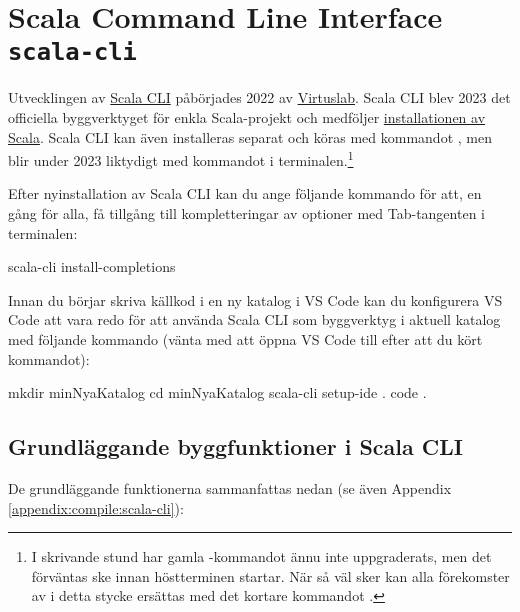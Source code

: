 \section{Scala Command Line Interface \texttt{scala-cli}}\label{appendix:build:scala-cli}

Utvecklingen av \href{https://scala-cli.virtuslab.org/}{Scala CLI} påbörjades 2022 av \href{https://virtuslab.com/}{Virtuslab}. Scala CLI blev 2023 det officiella byggverktyget för enkla Scala-projekt och medföljer \href{https://www.scala-lang.org/download/}{installationen av Scala}. Scala CLI kan även installeras separat och köras med kommandot , men blir under 2023 liktydigt med kommandot  i terminalen.\footnote{I skrivande stund har gamla -kommandot ännu inte uppgraderats, men det förväntas ske innan höstterminen startar. När så väl sker kan alla förekomster av  i detta stycke ersättas med det kortare kommandot .}

Efter nyinstallation av Scala CLI kan du ange följande kommando för att, en gång för alla, få tillgång till kompletteringar av optioner med Tab-tangenten i terminalen:
\begin{REPLsmall}
scala-cli install-completions 
\end{REPLsmall}

Innan du börjar skriva källkod i en ny katalog i VS Code kan du konfigurera VS Code att vara redo för att använda Scala CLI som byggverktyg i aktuell katalog med följande kommando (vänta med att öppna VS Code till efter att du kört kommandot): 
\begin{REPLsmall}
mkdir minNyaKatalog
cd minNyaKatalog
scala-cli setup-ide . 
code .
\end{REPLsmall}
	

\subsection{Grundläggande byggfunktioner i Scala CLI}

De grundläggande funktionerna sammanfattas nedan (se även Appendix \ref{appendix:compile:scala-cli}):

